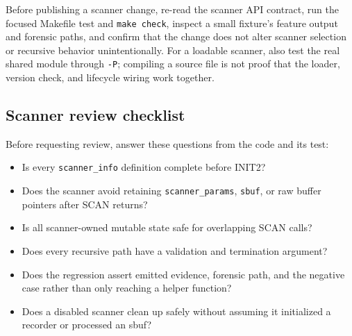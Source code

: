 \documentclass[11pt]{article}
\newcommand{\code}[1]{\texttt{#1}}
\begin{document}
Before publishing a scanner change, re-read the scanner API contract, run the
focused Makefile test and \code{make check}, inspect a small fixture's feature
output and forensic paths, and confirm that the change does not alter scanner
selection or recursive behavior unintentionally. For a loadable scanner, also
test the real shared module through \code{-P}; compiling a source file is not
proof that the loader, version check, and lifecycle wiring work together.

\subsection{Scanner review checklist}

Before requesting review, answer these questions from the code and its test:

\begin{itemize}
\item Is every \code{scanner\_info} definition complete before INIT2?
\item Does the scanner avoid retaining \code{scanner\_params}, \code{sbuf},
  or raw buffer pointers after SCAN returns?
\item Is all scanner-owned mutable state safe for overlapping SCAN calls?
\item Does every recursive path have a validation and termination argument?
\item Does the regression assert emitted evidence, forensic path, and the
  negative case rather than only reaching a helper function?
\item Does a disabled scanner clean up safely without assuming it initialized
  a recorder or processed an sbuf?
\end{itemize}



\end{document}
